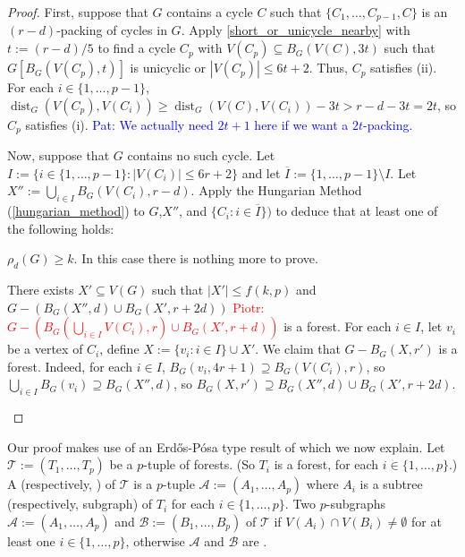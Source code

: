 \documentclass{patmorin}
\newcommand{\pat}[1]{\textcolor{Blue}{Pat: #1}}
\newcommand{\piotr}[1]{\textcolor{red}{Piotr: #1}}
\DeclareMathOperator{\dist}{dist}
\begin{document}
\begin{proof}
  First, suppose that $G$ contains a cycle $C$ such that $\{C_1,\ldots,C_{p-1},C\}$ is an $(r-d)$-packing of cycles in $G$.  Apply \cref{short_or_unicycle_nearby} with $t:=(r-d)/5$ to find a cycle $C_p$ with $V(C_p)\subseteq B_G(V(C),3t)$ such that $G[B_G(V(C_p),t)]$ is unicyclic or $|V(C_p)|\le 6t+2$.  Thus, $C_p$ satisfies (ii).  For each $i\in\{1,\ldots,p-1\}$, $\dist_G(V(C_p),V(C_i))\ge \dist_G(V(C),V(C_i))-3t > r-d - 3t = 2t$, so $C_p$ satisfies (i). \pat{We actually need $2t+1$ here if we want a $2t$-packing.}

  Now, suppose that $G$ contains no such cycle.  Let $I:=\{i\in\{1,\ldots,p-1\}:|V(C_i)|\le 6r+2\}$ and let $\overline{I}:=\{1,\ldots,p-1\}\setminus I$.
  Let $X'':=\bigcup_{i\in I}B_G(V(C_i),r-d)$.  Apply the Hungarian Method (\cref{hungarian_method}) to $G$,$X''$, and $\{C_i:i\in\overline{I}\})$ to deduce that at least one of the following holds:
  \begin{compactenum}[(a)]\setcounter{enumi}{1}
    \item $\rho_d(G)\ge k$.  In this case there is nothing more to prove.
    \item There exists $X'\subseteq V(G)$ such that $|X'|\le f(k,p)$ and $G-(B_G(X'',d)\cup B_{G}(X',r+2d))$ 
    \piotr{$G-(B_G(\bigcup_{i\in I} V(C_i),r)\cup B_{G}(X',r+d))$} is a forest. For each $i\in I$, let $v_i$ be a vertex of $C_i$, define $X:=\{v_i:i\in I\}\cup X'$.  We claim that $G-B_G(X,r')$ is a forest.  Indeed, for each $i\in I$, $B_G(v_i,4r+1)\supseteq B_G(V(C_i),r)$, so $\bigcup_{i\in I}B_G(v_i)\supseteq B_G(X'',d)$, so $B_G(X,r')\supseteq B_G(X'',d)\cup B_{G}(X',r+2d)$. \qedhere
  \end{compactenum}
\end{proof}




Our proof makes use of an Erd\H{o}s-P\'osa type result of \citet{gyarfas.lehel:helly} which we now explain.  Let $\mathcal{T}:=(T_1,\ldots,T_p)$ be a $p$-tuple of forests.  (So $T_i$ is a forest, for each $i\in\{1,\ldots,p\}$.)  A  (respectively, ) of $\mathcal{T}$ is a $p$-tuple $\mathcal{A}:=(A_1,\ldots,A_p)$ where $A_i$ is a subtree (respectively, subgraph) of $T_i$ for each $i\in\{1,\ldots,p\}$.  Two $p$-subgraphs $\mathcal{A}:=(A_1,\ldots,A_p)$ and $\mathcal{B}:=(B_1,\ldots,B_p)$ of $\mathcal{T}$  if $V(A_i)\cap V(B_i)\neq\emptyset$ for at least one $i\in\{1,\ldots,p\}$, otherwise $\mathcal{A}$ and $\mathcal{B}$ are .
\end{document}
